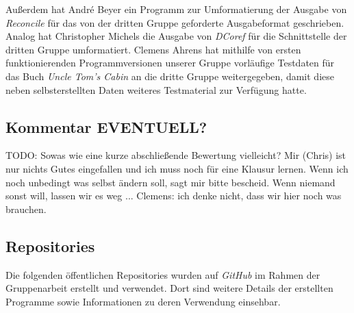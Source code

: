 \documentclass[a4paper,12pt,titlepage=true, ngerman]{scrartcl}
\begin{document}
Außerdem hat André Beyer ein Programm zur Umformatierung der Ausgabe von \emph{Reconcile} für das 
von der dritten Gruppe geforderte Ausgabeformat geschrieben. 
Analog hat Christopher Michels die Ausgabe von \emph{DCoref} für die Schnittstelle der dritten Gruppe umformatiert. 
Clemens Ahrens hat mithilfe von ersten funktionierenden Programmversionen unserer Gruppe vorläufige Testdaten 
für das Buch \emph{Uncle Tom's Cabin} \autocite[]{chris_uncle} an die dritte Gruppe weitergegeben, 
damit diese neben selbsterstellten Daten weiteres Testmaterial zur Verfügung hatte.


\subsection{Kommentar EVENTUELL?}\label{Kommentar}%

TODO: Sowas wie eine kurze abschließende Bewertung vielleicht? 
Mir (Chris) ist nur nichts Gutes eingefallen und ich muss noch für eine Klausur lernen. 
Wenn ich noch unbedingt was selbst ändern soll, sagt mir bitte bescheid. 
Wenn niemand sonst will, lassen wir es weg ...
Clemens: ich denke nicht, dass wir hier noch was brauchen.



\subsection{Repositories}\label{Repositories}

Die folgenden öffentlichen Repositories wurden auf \emph{GitHub} \autocite[]{chris_github} im Rahmen 
der Gruppenarbeit erstellt und verwendet. 
Dort sind weitere Details der erstellten Programme sowie Informationen zu deren Verwendung einsehbar.
\end{document}
